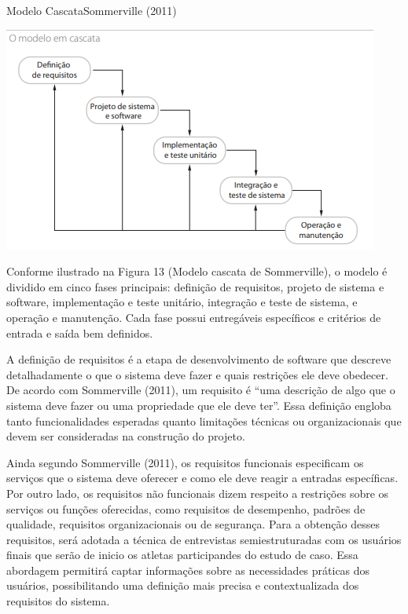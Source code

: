 \begin{figura}{Modelo Cascata}{Sommerville (2011)}
    \begin{flushleft}
        \label{fig:modelo-cascata}
        \includegraphics[width=0.95\linewidth]{resources/floats/ilustracoes/cascata.png}
    \end{flushleft}
\end{figura}

Conforme ilustrado na Figura 13 (Modelo cascata de Sommerville), o modelo é dividido em cinco fases principais: definição de requisitos, 
projeto de sistema e software, implementação e teste unitário, integração e teste de sistema, e operação e manutenção. 
Cada fase possui entregáveis específicos e critérios de entrada e saída bem definidos.

\label{sssec:def-requisitos}

A definição de requisitos é a etapa de desenvolvimento de software que descreve detalhadamente o que o sistema deve fazer e quais restrições ele deve obedecer. 
De acordo com Sommerville (2011), um requisito é “uma descrição de algo que o sistema deve fazer ou uma propriedade que ele deve ter”. 
Essa definição engloba tanto funcionalidades esperadas quanto limitações técnicas ou organizacionais que devem ser consideradas na construção do projeto.

Ainda segundo Sommerville (2011), os requisitos funcionais especificam os serviços que o sistema deve oferecer e como ele deve reagir a entradas específicas. 
Por outro lado, os requisitos não funcionais dizem respeito a restrições sobre os serviços ou funções oferecidas, como requisitos de desempenho, padrões de qualidade, requisitos organizacionais ou de segurança. 
Para a obtenção desses requisitos, será adotada a técnica de entrevistas semiestruturadas com os usuários finais que serão de inicio os atletas participandes do estudo de caso. 
Essa abordagem permitirá captar informações sobre as necessidades práticas dos usuários, possibilitando uma definição mais precisa e contextualizada dos requisitos do sistema.


